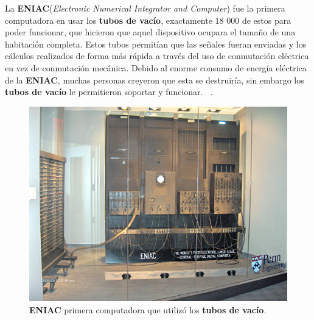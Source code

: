 \indent La \textbf{ENIAC}(\emph{Electronic Numerical Integrator and Computer}) fue la primera computadora en usar los \textbf{tubos de vacío},
exactamente 18 000 de estos para poder funcionar, que hicieron que aquel dispositivo ocupara el tamaño de una habitación completa. Estos tubos
permitían que las señales fueran enviadas y los cálculos realizados de forma más rápida a través del uso de conmutación eléctrica en vez de
conmutación mecánica. Debido al enorme consumo de energía eléctrica de la \textbf{ENIAC}, muchas personas creyeron que esta se destruiría,
sin embargo los \textbf {tubos de vacío} le permitieron soportar y funcionar. ~.\\

\begin{figure}[htb]
	\centering
	\includegraphics[scale = 0.13]{Graphics/ENIAC.jpg}
	\caption{\textbf{ENIAC} primera computadora que utilizó los \textbf{tubos de vacío}.}
	\label{fig:1}
\end{figure}

